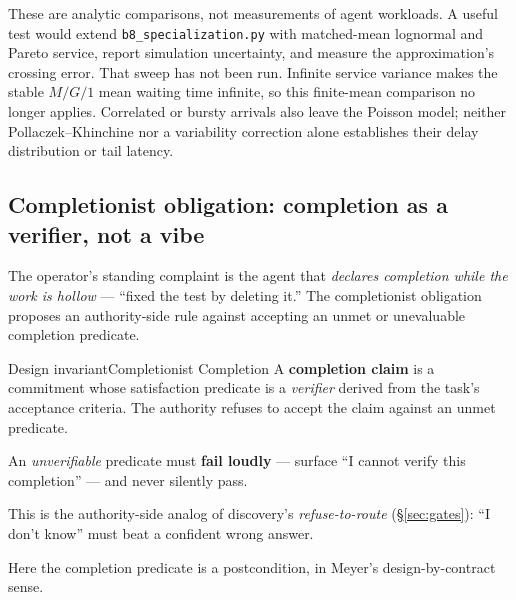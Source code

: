 \documentclass[11pt,a4paper]{article}
\theoremstyle{definition}
\theoremstyle{plain}
\begin{document}
These are analytic comparisons, not measurements of agent workloads. A useful
test would extend \texttt{b8\_specialization.py} with matched-mean lognormal and
Pareto service, report simulation uncertainty, and measure the approximation's
crossing error. That sweep has not been run. Infinite service variance makes the
stable $M/G/1$ mean waiting time infinite, so this finite-mean comparison no longer
applies. Correlated or bursty arrivals also leave the Poisson model; neither
Pollaczek--Khinchine nor a variability correction alone establishes their delay
distribution or tail latency.

\subsection{Completionist obligation: completion as a verifier, not a vibe}\label{sec:completionist}

The operator's standing complaint is the agent that \emph{declares completion while
the work is hollow} --- ``fixed the test by deleting it.'' The completionist
obligation proposes an authority-side rule against accepting an unmet or
unevaluable completion predicate.

\begin{pdclaim}{Design invariant}{Completionist Completion}
\setlength{\parskip}{4pt plus 1pt}
\label{def:completionist}
A \textbf{completion claim} is a commitment whose satisfaction predicate is a
\emph{verifier} derived from the task's acceptance criteria. The authority refuses to
accept the claim against an unmet predicate.

An \emph{unverifiable} predicate must
\textbf{fail loudly} --- surface ``I cannot verify this completion'' --- and never
silently pass.

This is the authority-side analog of discovery's
\emph{refuse-to-route} (\S\ref{sec:gates}): ``I don't know'' must beat a confident
wrong answer.
\end{pdclaim}



Here the completion predicate is a postcondition, in Meyer's design-by-contract
sense.

\end{document}
